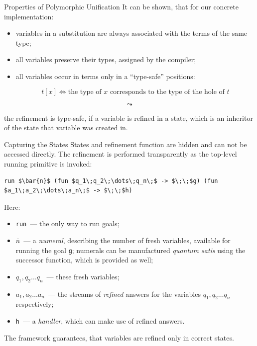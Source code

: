 \documentclass[10pt, mathserif]{beamer}
\theoremstyle{definition}
\begin{document}
\begin{frame}[fragile]{Properties of Polymorphic Unification}
It can be shown, that for our concrete implementation:

\begin{itemize}
\item variables in a substitution are always associated with the terms of the same type;
\item all variables preserve their types, assigned by the compiler;
\item all variables occur in terms only in a ``type-safe'' positions:

$$
t[x] \iff \mbox{the type of }x\mbox{ corresponds to the type of the hole of }t 
$$ 
\end{itemize}\pause

$$\leadsto$$

the refinement is type-safe, if a variable is refined in a state, which is an inheritor
of the state that variable was created in.
\end{frame}

\begin{frame}[fragile]{Capturing the States}
States and refinement function are hidden and can not be accessed directly.\pause
\vskip3mm
The refinement is performed transparently as the top-level running primitive
is invoked:\pause
\vskip3mm
\begin{lstlisting}[mathescape=true]
    run $\bar{n}$ (fun $q_1\;q_2\;\dots\;q_n\;$ -> $\;\;$g) (fun $a_1\;a_2\;\dots\;a_n\;$ -> $\;\;$h)
\end{lstlisting}\pause

Here:
{\small
\begin{itemize}
\item \lstinline{run}~--- the only way to run goals;
\item $\bar{n}$~--- a \emph{numeral}, describing the number of fresh variables, 
available for running the goal \lstinline{g}; numerals can be manufactured
\emph{quantum satis} using the successor function, which is provided as well;
\item $q_1, q_2\dots q_n$~--- these fresh variables;
\item $a_1, a_2\dots a_n$~--- the streams of \emph{refined} answers for the variables
$q_1, q_2\dots q_n$ respectively;
\item \lstinline{h}~--- a \emph{handler}, which can make use of refined answers.
\end{itemize}
}

The framework guarantees, that variables are refined only in correct states.

\end{frame}
\end{document}
